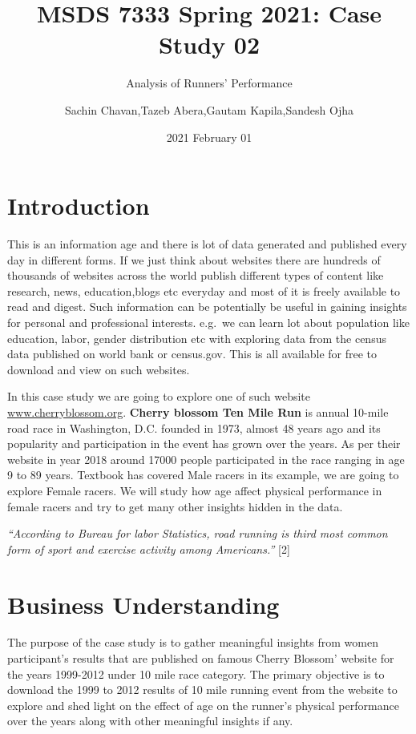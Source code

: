 \documentclass[
]{article}
\title{MSDS 7333 Spring 2021: Case Study 02}
\subtitle{Analysis of Runners' Performance}
\author{Sachin Chavan,Tazeb Abera,Gautam Kapila,Sandesh Ojha}
\date{2021 February 01}
\begin{document}
\maketitle

\hypertarget{introduction}{%
\section{Introduction}\label{introduction}}

This is an information age and there is lot of data generated and
published every day in different forms. If we just think about websites
there are hundreds of thousands of websites across the world publish
different types of content like research, news, education,blogs etc
everyday and most of it is freely available to read and digest. Such
information can be potentially be useful in gaining insights for
personal and professional interests. e.g.~we can learn lot about
population like education, labor, gender distribution etc with exploring
data from the census data published on world bank or census.gov. This is
all available for free to download and view on such websites.

In this case study we are going to explore one of such website
\href{http://www.cherryblossom.org/}{www.cherryblossom.org}.
\textbf{Cherry blossom Ten Mile Run} is annual 10-mile road race in
Washington, D.C. founded in 1973, almost 48 years ago and its popularity
and participation in the event has grown over the years. As per their
website in year 2018 around 17000 people participated in the race
ranging in age 9 to 89 years. Textbook has covered Male racers in its
example, we are going to explore Female racers. We will study how age
affect physical performance in female racers and try to get many other
insights hidden in the data.

\emph{``According to Bureau for labor Statistics, road running is third
most common form of sport and exercise activity among Americans.''}
{[}2{]}

\hypertarget{business-understanding}{%
\section{Business Understanding}\label{business-understanding}}

The purpose of the case study is to gather meaningful insights from
women participant's results that are published on famous Cherry Blossom'
website for the years 1999-2012 under 10 mile race category. The primary
objective is to download the 1999 to 2012 results of 10 mile running
event from the website to explore and shed light on the effect of age on
the runner's physical performance over the years along with other
meaningful insights if any.
\end{document}
